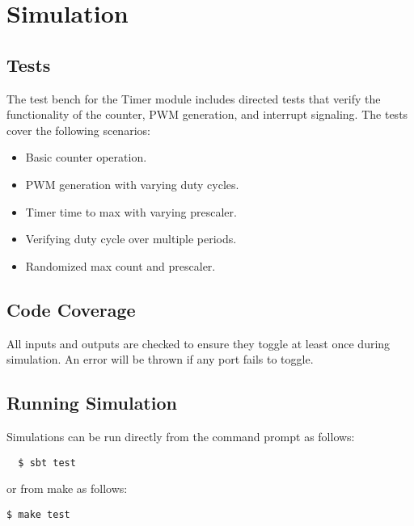 \section{Simulation}

\subsection{Tests}
The test bench for the Timer module includes directed tests that verify the functionality of the counter, PWM generation, and interrupt signaling. The tests cover the following scenarios:

\begin{itemize}
  \item{Basic counter operation.}
  \item{PWM generation with varying duty cycles.}
  \item{Timer time to max with varying prescaler.}
  \item{Verifying duty cycle over multiple periods.}
  \item{Randomized max count and prescaler.}
\end{itemize}

\subsection{Code Coverage}
All inputs and outputs are checked to ensure they toggle at least once during simulation. An error will be thrown if any port fails to toggle.

\subsection{Running Simulation}
Simulations can be run directly from the command prompt as follows:

\begin{verbatim}
  $ sbt test
\end{verbatim}

or from make as follows:

\texttt{\$ make test}